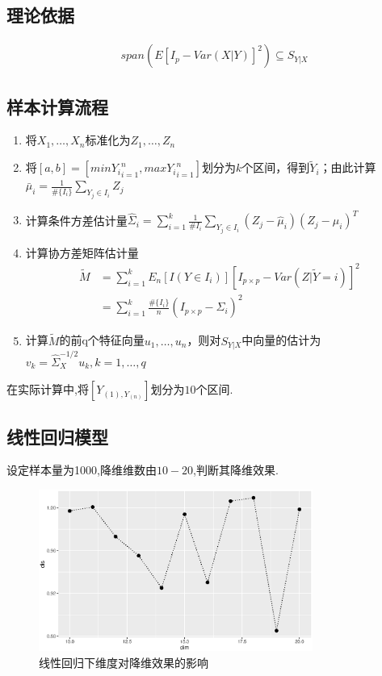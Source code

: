 \subsection{理论依据}
\begin{align*}
    &span(E[I_p-Var(X|Y)]^2) \subseteq S_{Y|X}
\end{align*}
\subsection{样本计算流程}
\begin{enumerate}
    \item 将$X_1,\dots,X_n$标准化为$Z_1,\dots,Z_n$
    \item 将$[a,b]=[min{Y_i}_{i=1}^n,max{Y_i}_{i=1}^n]$划分为$k$个区间，得到$\widetilde{Y}_i$；由此计算$\bar{\mu}_i=\frac{1}{\#\{I_i\}}\sum_{Y_j\in I_i}Z_j$
    \item 计算条件方差估计量$\hat{\Sigma}_i=\sum_{i=1}^k\frac{1}{\#I_i}\sum_{Y_j\in I_i}(Z_j-\hat{\mu}_i)(Z_j-\hat{\mu}_i)^T$
    \item 计算协方差矩阵估计量
    \begin{align*}
        \widetilde{M}&=\sum_{i=1}^kE_n[I(Y\in I_i)] [I_{p\times p}-Var(Z|\widetilde{Y}=i)]^2 \\
        &=\sum_{i=1}^k\frac{\#\{I_i\}}{n}(I_{p\times p}-\hat{\Sigma}_i)^2
    \end{align*}
    \item 计算$\widetilde{M}$的前q个特征向量$u_1,\dots,u_n$，则对$S_{Y|X}$中向量的估计为$v_k=\hat{\Sigma}_{X}^{-1/2}u_k,k=1,\dots,q$
    
\end{enumerate}
在实际计算中,将$[Y_{(1),Y_(n)}]$划分为$10$个区间.
\subsection{线性回归模型}
设定样本量为1000,降维维数由$10-20$,判断其降维效果.
\begin{figure}[htbp]
    \centering
    \includegraphics[width=0.8\textwidth]{image/norm_save.eps}
    \caption{线性回归下维度对降维效果的影响}
\end{figure}


